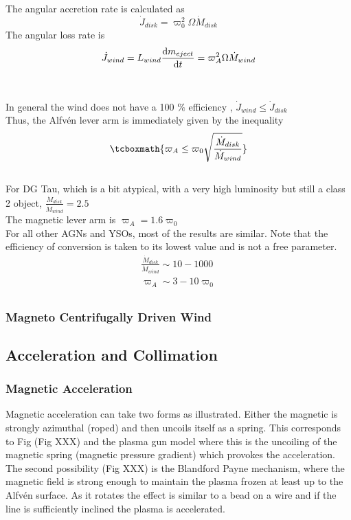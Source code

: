 \documentclass[10pt,a4paper,english]{article}
\begin{document}
The angular accretion rate is calculated as
\begin{equation}
   \dot{J}_{disk} = \varpi^{2}_{0} \Omega \dot{M}_{disk}
\end{equation}
The angular loss rate is
\begin{equation}
   \dot{J}_{wind} = L_{wind} \frac{\mathrm{d}{m_{eject}}}{\mathrm{d}{t}}= \varpi^{2}_{A} \Omega \dot{M}_{wind}
\end{equation}
\\
\\
In general the wind does not have a 100 $\%$ efficiency , $\dot{J}_{wind} \leq \dot{J}_{disk}$
\\
Thus, the Alfvén lever arm is immediately given by the inequality 
\begin{equation}
    \tcboxmath{
     \varpi_{A} \leq \varpi_{0} \sqrt{\frac{\dot{M}_{disk}}{\dot{M}_{wind}}}  
    }
\end{equation}
\\
For DG Tau, which is a bit atypical, with a very high luminosity but still a class 2 object, $\frac{\dot{M}_{disk}}{\dot{M}_{wind}} = 2.5$
\\
The magnetic lever arm is $\varpi_{A} = 1.6 \varpi_{0}$
\\
For all other AGNs and YSOs, most of the results are similar. Note that the efficiency of conversion is taken to its lowest value and is not a free parameter.
\begin{align*}
   \frac{\dot{M}_{disk}}{\dot{M}_{wind}} \sim 10 - 1000 \\
   \varpi_{A} \sim 3-10 \varpi_{0} \\
\end{align*}



\subsubsection{Magneto Centrifugally Driven Wind}
\subsection{Acceleration and Collimation}
\subsubsection{Magnetic Acceleration}

Magnetic acceleration can take two forms as illustrated. Either the magnetic is
strongly azimuthal (roped) and then uncoils itself as a spring. This
corresponds to Fig (Fig XXX) and the plasma gun model where this is the
uncoiling of the magnetic spring (magnetic pressure gradient) which provokes
the acceleration. The second possibility (Fig XXX) is the Blandford Payne
mechanism, where the magnetic field is strong enough to maintain the plasma
frozen at least up to the Alfvén surface. As it rotates the effect is similar
to a bead on a wire and if the line is sufficiently inclined the plasma is
accelerated.
\end{document}
